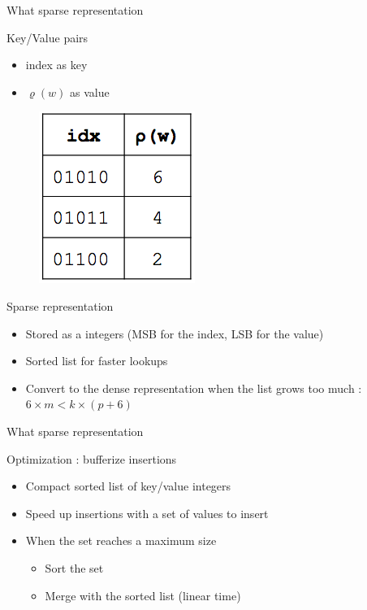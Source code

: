 \documentclass{beamer}
\begin{document}
\begin{frame}{What sparse representation}


  \begin{minipage}{0.5\textwidth}%
    \begin{block}{Key/Value pairs}
      \begin{itemize}
        \item index as key
        \item $\varrho(w)$ as value
      \end{itemize}
    \end{block}
  \end{minipage}%
  \hfill%
  \begin{minipage}{0.5\textwidth}%
    \begin{figure}[c]
      \includegraphics [scale=0.5]  {hyperloglog_list.png}
    \end{figure}
  \end{minipage}%


  \begin{block}{Sparse representation}
    \begin{itemize}
      \item Stored as a integers (MSB for the index, LSB for the value)
      \item Sorted list for faster lookups
      \item Convert to the dense representation when the list grows too much : $6\times m < k\times (p + 6)$
    \end{itemize}
  \end{block}

\end{frame}


\begin{frame}{What sparse representation}


  \begin{block}{Optimization : bufferize insertions}
    \begin{itemize}
      \item Compact sorted list of key/value integers
      \item Speed up insertions with a set of values to insert
      \item When the set reaches a maximum size
      \begin{itemize}
        \item Sort the set
        \item Merge with the sorted list (linear time)
      \end{itemize}
    \end{itemize}
  \end{block}

\end{frame}
\end{document}
